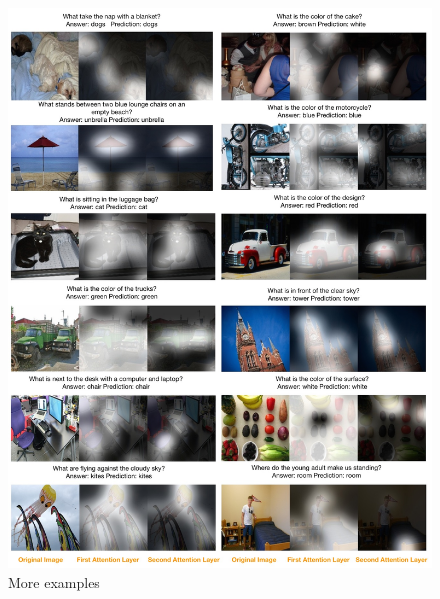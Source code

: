 \documentclass[10pt,twocolumn,letterpaper]{article}
\begin{document}
\appendix
\begin{figure}[!tbhp]
  \includegraphics[width=1.0\linewidth]
{visualization_appendix.jpg}
  \centering
  \caption{More examples}
  \label{fig:vqa_examples_appendix}
\end{figure}
\end{document}
